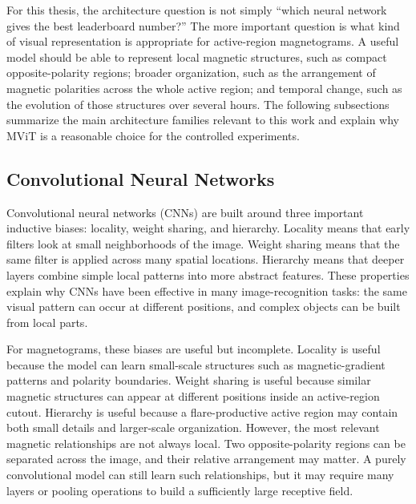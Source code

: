 For this thesis, the architecture question is not simply ``which neural network gives the best leaderboard number?'' The more important question is what kind of visual representation is appropriate for active-region magnetograms. A useful model should be able to represent local magnetic structures, such as compact opposite-polarity regions; broader organization, such as the arrangement of magnetic polarities across the whole active region; and temporal change, such as the evolution of those structures over several hours. The following subsections summarize the main architecture families relevant to this work and explain why MViT is a reasonable choice for the controlled experiments.

\subsection{Convolutional Neural Networks}

Convolutional neural networks (CNNs) are built around three important inductive biases: locality, weight sharing, and hierarchy. Locality means that early filters look at small neighborhoods of the image. Weight sharing means that the same filter is applied across many spatial locations. Hierarchy means that deeper layers combine simple local patterns into more abstract features. These properties explain why CNNs have been effective in many image-recognition tasks: the same visual pattern can occur at different positions, and complex objects can be built from local parts.

For magnetograms, these biases are useful but incomplete. Locality is useful because the model can learn small-scale structures such as magnetic-gradient patterns and polarity boundaries. Weight sharing is useful because similar magnetic structures can appear at different positions inside an active-region cutout. Hierarchy is useful because a flare-productive active region may contain both small details and larger-scale organization. However, the most relevant magnetic relationships are not always local. Two opposite-polarity regions can be separated across the image, and their relative arrangement may matter. A purely convolutional model can still learn such relationships, but it may require many layers or pooling operations to build a sufficiently large receptive field.


